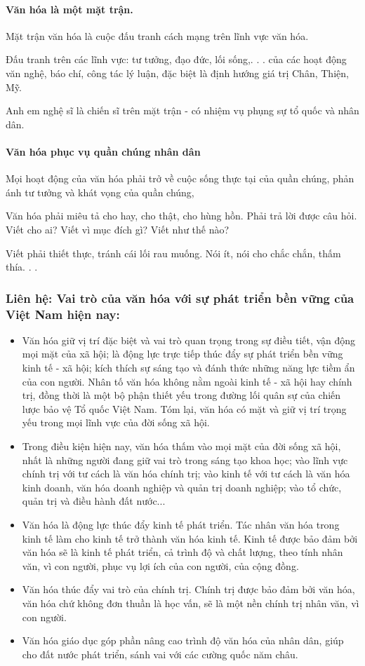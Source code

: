 \paragraph{Văn hóa là một mặt trận.}
Mặt trận văn hóa là cuộc đấu tranh cách mạng trên lĩnh vực văn hóa.

Đấu tranh trên các lĩnh vực: tư tưởng, đạo đức, lối sống,. . . của các hoạt động văn nghệ, báo chí, công tác lý luận, đặc biệt là định hướng giá trị Chân, Thiện, Mỹ.

Anh em nghệ sĩ là chiến sĩ trên mặt trận - có nhiệm vụ phụng sự tổ quốc và nhân dân.

\paragraph{Văn hóa phục vụ quần chúng nhân dân}
Mọi hoạt động của văn hóa phải trở về cuộc sống thực tại của quần chúng, phản ánh tư tưởng và khát vọng của quần chúng,

Văn hóa phải miêu tả cho hay, cho thật, cho hùng hồn. Phải trả lời được câu hỏi. Viết cho ai? Viết vì mục đích gì? Viết như thế nào?

Viết phải thiết thực, tránh cái lối rau muống. Nói ít, nói cho chắc chắn, thấm thía. . .

\subsubsection{Liên hệ: Vai trò của văn hóa với sự phát triển bền vững của Việt Nam hiện nay:}
\begin{itemize}
    \item Văn hóa giữ vị trí đặc biệt và vai trò quan trọng trong sự điều tiết, vận động mọi mặt của xã hội; là động lực trực tiếp thúc đẩy sự phát triển bền vững kinh tế - xã hội; kích thích sự sáng tạo và đánh thức những năng lực tiềm ẩn của con người. Nhân tố văn hóa không nằm ngoài kinh tế - xã hội hay chính trị, đồng thời là một bộ phận thiết yếu trong đường lối quân sự của chiến lược bảo vệ Tổ quốc Việt Nam. Tóm lại, văn hóa có mặt và giữ vị trí trọng yếu trong mọi lĩnh vực của đời sống xã hội.
    \item Trong điều kiện hiện nay, văn hóa thấm vào mọi mặt của đời sống xã hội, nhất là những người đang giữ vai trò trong sáng tạo khoa học; vào lĩnh vực chính trị với tư cách là văn hóa chính trị; vào kinh tế với tư cách là văn hóa kinh doanh, văn hóa doanh nghiệp và quản trị doanh nghiệp; vào tổ chức, quản trị và điều hành đất nước...
    \item Văn hóa là động lực thúc đẩy kinh tế phát triển. Tác nhân văn hóa trong kinh tế làm cho kinh tế trở thành văn hóa kinh tế. Kinh tế được bảo đảm bởi văn hóa sẽ là kinh tế phát triển, cả trình độ và chất lượng, theo tính nhân văn, vì con người, phục vụ lợi ích của con người, của cộng đồng.
    \item Văn hóa thúc đẩy vai trò của chính trị. Chính trị được bảo đảm bởi văn hóa, văn hóa chứ không đơn thuần là học vấn, sẽ là một nền chính trị nhân văn, vì con người.
    \item Văn hóa giáo dục góp phần nâng cao trình độ văn hóa của nhân dân, giúp cho đất nước phát triển, sánh vai với các cường quốc năm châu.
\end{itemize}

\cleardoublepage